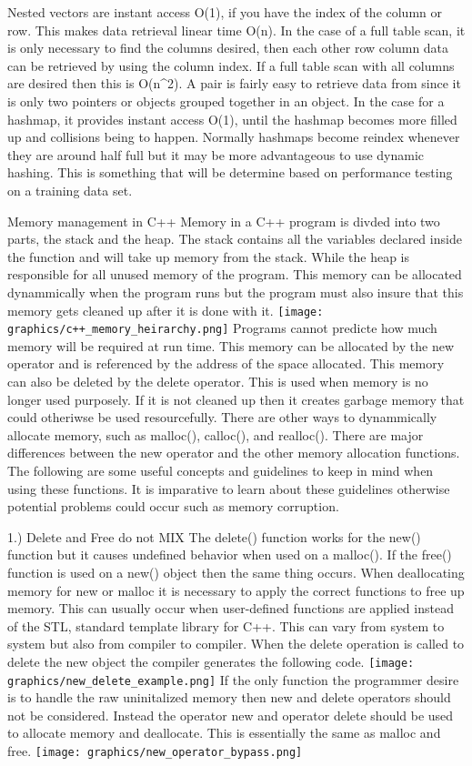 \documentclass[letterpaper, 12pt]{article}
\begin{document}
	Nested vectors are instant access O(1), if you have the index of the column or row. This makes data retrieval
	linear time O(n). In the case of a full table scan, it is only necessary to find the columns desired, then each other row
	column data can be retrieved by using the column index. If a full table scan with all columns are desired then this is O(n^2). A pair is fairly easy to retrieve data from since it is only two pointers or objects grouped together in an object. In the case for a hashmap, it provides instant access O(1), until the hashmap becomes more filled up and collisions being to happen. Normally hashmaps become reindex whenever they are around half full but it may be more advantageous to use dynamic hashing. This is something that will be determine based on performance testing on a training data set.

Memory management in C++
	Memory in a C++ program is divded into two parts, the stack and the heap. The stack contains all the variables
	declared inside the function and will take up memory from the stack. While the heap is responsible for all unused memory 
	of the program. This memory can be allocated dynammically when the program runs but the program must also insure that this memory gets cleaned up after it is done with it.
	\texttt{[image: graphics/c++\_memory\_heirarchy.png]}
	Programs cannot predicte how much memory will be required at run time. This memory can be allocated by the new operator and is referenced by the address of the space allocated. This memory can also be deleted by the delete operator. This is used when memory is no longer used purposely. If it is not cleaned up then it creates garbage memory that could otheriwse be used resourcefully. There are other ways to dynammically allocate memory, such as malloc(), calloc(), and realloc(). There are major differences between the new operator and the other memory allocation functions.  The following are some useful concepts and guidelines to keep in mind when using these functions. It is imparative to learn about these guidelines otherwise potential problems could occur such as memory corruption.

1.) Delete and Free do not MIX
	The delete() function works for the new() function but it causes undefined behavior when used on a malloc(). If the free() function is used on a new() object then the same thing occurs. When deallocating memory for new or malloc it is necessary to apply the correct functions to free up memory. This can usually occur when user-defined functions are applied instead of the STL, standard template library for C++. This can vary from system to system but also from compiler to compiler. When the delete operation is called to delete the new object the compiler generates the following code.
	\texttt{[image: graphics/new\_delete\_example.png]}
	If the only function the programmer desire is to handle the raw uninitalized memory then new and delete operators should not be considered. Instead the operator new and operator delete should be used to allocate memory and deallocate. This is essentially the same as malloc and free.
	\texttt{[image: graphics/new\_operator\_bypass.png]}
\end{document}
